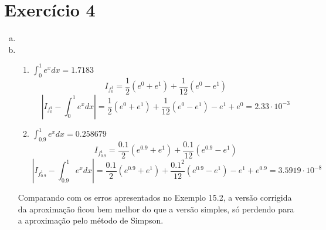 \documentclass[leqno]{article}
\begin{document}
\section*{Exercício 4}
    \begin{enumerate}[a)]
        \item 
        \item 
            \begin{enumerate}[1.]
                \item $\int_0^1 e^x dx = 1.7183$
                $$ I_{f_0^1}  = \frac{1}{2}(e^0 + e^1) + \frac{1}{12}(e^0 - e^1) $$
                $$ \left| I_{f_0^1} - \int_0^1 e^x dx\right| = \frac{1}{2}(e^0 + e^1) + \frac{1}{12}(e^0 - e^1) - e^1 + e^0 = 2.33 \cdot 10^{-3}$$
                
                \item $\int_{0.9}^1 e^x dx = 0.258679$
                    $$ I_{f_{0.9}^1}  = \frac{0.1}{2}(e^{0.9} + e^1) + \frac{0.1}{12}(e^{0.9} - e^1) $$
                    $$ \left| I_{f_{0.9}^1} - \int_{0.9}^1 e^x dx\right| = \frac{0.1}{2}(e^{0.9} + e^1) + \frac{0.1^2}{12}(e^{0.9} - e^1) - e^1 + e^{0.9} = 3.5919 \cdot 10^{-8}$$
            \end{enumerate}

            Comparando com os erros apresentados no Exemplo 15.2, a versão corrigida
            da aproximação ficou bem melhor do que a versão simples, só perdendo
            para a aproximação pelo método de Simpson.
    \end{enumerate}
\end{document}
